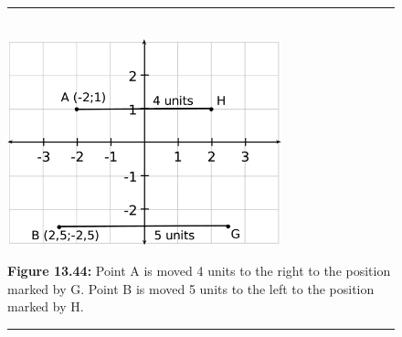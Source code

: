 	\begin{figure}[H] %
    \begin{center}
    \rule[.1in]{\figurerulewidth}{.005in} \\
        \label{m39358*uid7134!!!underscore!!!media}\label{m39358*uid71!!!underscore!!!printimage}\includegraphics[width=300px]{col11306.imgs/m39358_MG10C14_025.png} %
        
      \vspace{2pt}
    \vspace{\rubberspace}\par \begin{cnxcaption}
	  \small \textbf{Figure 13.44: }Point A is moved 4 units to the right to the position marked by G. Point B is moved 5 units to the left to the position marked by H.
	\end{cnxcaption}
      
    \vspace{.1in}
    \rule[.1in]{\figurerulewidth}{.005in} \\
        
    \end{center}

 \end{figure}   

    \addtocounter{footnote}{-0}
    
